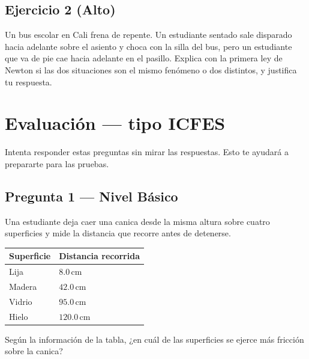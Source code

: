 \documentclass[
  spanish,
  letterpaper,
  12pt,
  oneside,
  open=any,
  DIV=15]{scrbook}
\newcounter{none} %
\newcommand{\setcolorsection}[2]{%
  \definecolor{currentsectionbg}{HTML}{#1}%
  \definecolor{currentsectionborder}{HTML}{#2}%
}
\begin{document}
\subsection{Ejercicio 2 (Alto)}\label{ejercicio-2-alto}

Un bus escolar en Cali frena de repente. Un estudiante sentado sale
disparado hacia adelante sobre el asiento y choca con la silla del bus,
pero un estudiante que va de pie cae hacia adelante en el pasillo.
Explica con la primera ley de Newton si las dos situaciones son el mismo
fenómeno o dos distintos, y justifica tu respuesta.

\setcolorsection{f0c4b8}{dcb0a4}

\section{Evaluación --- tipo ICFES}\label{evaluaciuxf3n-tipo-icfes}

Intenta responder estas preguntas sin mirar las respuestas. Esto te
ayudará a prepararte para las pruebas.

\subsection{Pregunta 1 --- Nivel
Básico}\label{pregunta-1-nivel-buxe1sico}

Una estudiante deja caer una canica desde la misma altura sobre cuatro
superficies y mide la distancia que recorre antes de detenerse.

{\def\LTcaptype{none} %
\begin{longtable}[]{@{}ll@{}}
\toprule\noalign{}
Superficie & Distancia recorrida \\
\midrule\noalign{}
\endhead
\bottomrule\noalign{}
\endlastfoot
Lija & \(8.0\,\text{cm}\) \\
Madera & \(42.0\,\text{cm}\) \\
Vidrio & \(95.0\,\text{cm}\) \\
Hielo & \(120.0\,\text{cm}\) \\
\end{longtable}
}

Según la información de la tabla, ¿en cuál de las superficies se ejerce
más fricción sobre la canica?
\end{document}
